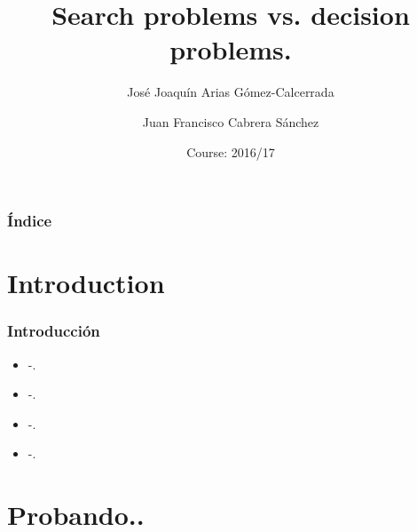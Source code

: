 \documentclass[aspectratio=1610]{beamer}
\title{Search problems vs. decision problems.}
\author[]{José Joaquín Arias Gómez-Calcerrada \and Juan Francisco Cabrera Sánchez}
\date{Course: 2016/17}
\begin{document}
\maketitle
\begin{frame}
\frametitle{Índice}
\tableofcontents[]
\end{frame}

\section{Introduction}
\begin{frame}[t]
\frametitle{Introducción}
\begin{itemize}
    \item -.
    \item -.
    \item -. 
    \item -.
\end{itemize}
\end{frame}




\section{Probando..}
\end{document}
